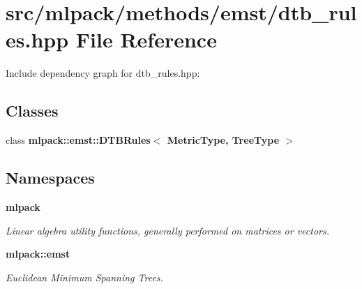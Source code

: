 \section{src/mlpack/methods/emst/dtb\-\_\-rules.hpp File Reference}
\label{dtb__rules_8hpp}
Include dependency graph for dtb\-\_\-rules.\-hpp\-:
\subsection*{Classes}
\begin{DoxyCompactItemize}
\item 
class {\bf mlpack\-::emst\-::\-D\-T\-B\-Rules$<$ Metric\-Type, Tree\-Type $>$}
\end{DoxyCompactItemize}
\subsection*{Namespaces}
\begin{DoxyCompactItemize}
\item 
{\bf mlpack}
\begin{DoxyCompactList}\small\item\em Linear algebra utility functions, generally performed on matrices or vectors. \end{DoxyCompactList}\item 
{\bf mlpack\-::emst}
\begin{DoxyCompactList}\small\item\em Euclidean Minimum Spanning Trees. \end{DoxyCompactList}\end{DoxyCompactItemize}
